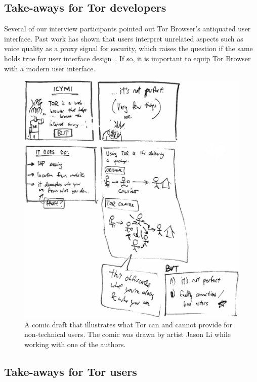 \subsection{Take-aways for Tor developers}

Several of our interview participants pointed out Tor Browser's antiquated user
interface.  Past work has shown that users interpret unrelated aspects such as
voice quality as a proxy signal for security, which raises the question if the
same holds true for user interface design~\cite[\S~IV.A]{Abu-Salma2017a}.  If
so, it is important to equip Tor Browser with a modern user interface.

\begin{figure}[t]
    \centering
    \includegraphics[width=\linewidth]{figures/tor-comic.jpg}
    \caption{A comic draft that illustrates what Tor can and cannot provide for
        non-technical users.  The comic was drawn by artist Jason Li while
        working with one of the authors.}
    \label{fig:tor-comic}
\end{figure}

\subsection{Take-aways for Tor users}

